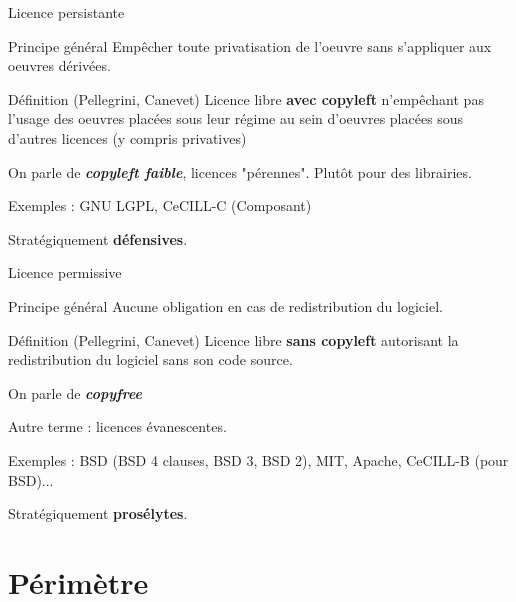 \documentclass{beamer}
\begin{document}
\begin{frame}{Licence persistante}

\begin{block}{Principe général}
    Empêcher toute privatisation de l'oeuvre sans s'appliquer aux oeuvres dérivées.
  \end{block}

  \begin{alertblock}{Définition (Pellegrini, Canevet)}
    Licence libre \textbf{avec copyleft} n'empêchant pas l'usage des oeuvres placées sous leur régime au sein d'oeuvres placées sous d'autres licences (y compris privatives)
   \end{alertblock}

On parle de \textit{\textbf{copyleft faible}}, licences "pérennes". Plutôt pour des librairies.
 
Exemples : GNU LGPL, CeCILL-C (Composant)

Stratégiquement \textbf{défensives}.

\end{frame}


\begin{frame}{Licence permissive}
  \begin{block}{Principe général}
    Aucune obligation en cas de redistribution du logiciel.
  \end{block}

  \begin{alertblock}{Définition (Pellegrini, Canevet)}
    Licence libre \textbf{sans copyleft} autorisant la redistribution du logiciel sans son code source.
   \end{alertblock}

On parle de \textit{\textbf{copyfree}}

Autre terme : licences évanescentes.

Exemples : BSD (BSD 4 clauses, BSD 3, BSD 2), MIT, Apache, CeCILL-B (pour BSD)... 

Stratégiquement \textbf{prosélytes}.
\end{frame}


\section{Périmètre}
\end{document}
